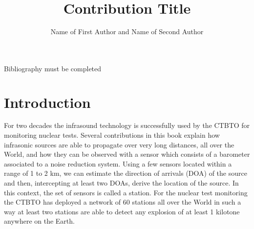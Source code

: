 \documentclass[graybox]{svmult/styles/svmult}
\begin{document}
 \sloppy
\title*{Contribution Title}
\author{Name of First Author and Name of Second Author}
%
%
\maketitle


{\color{red} Bibliography must be completed }


\setcounter{tocdepth}{3}
\tableofcontents
\def\thesection{\arabic{section}}



\section{Introduction} 
For two decades the infrasound technology is successfully used by the CTBTO for monitoring nuclear tests.
Several contributions in this book \cite{alexis2009} explain how infrasonic sources are able to propagate over very long distances, all over the World, and how they can be observed with a sensor which consists of a barometer associated to a noise reduction system. Using a few sensors located within a range of 1 to 2 km, we can estimate the direction of arrivals (DOA) of the source and then, intercepting at least two DOAs, derive the location of the source. In this context, the set of sensors is called a station. For the nuclear test monitoring the CTBTO has deployed a network of 60 stations all over the World in such a way at least two stations are able to detect any explosion of at least 1 kilotone anywhere on the Earth.
\end{document}
